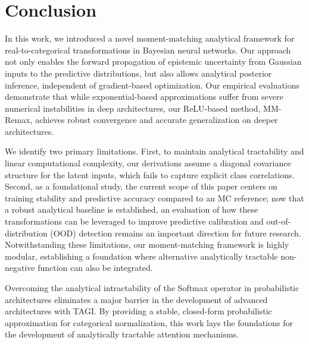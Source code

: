 \documentclass{uai2026} %
\begin{document}
\section{Conclusion}
In this work, we introduced a novel moment-matching analytical framework for real-to-categorical transformations in Bayesian neural networks. Our approach not only enables the forward propagation of epistemic uncertainty from Gaussian inputs to the predictive distributions, but also allows analytical posterior inference, independent of gradient-based optimization. Our empirical evaluations demonstrate that while exponential-based approximations suffer from severe numerical instabilities in deep architectures, our ReLU-based method, MM-Remax, achieves robust convergence and accurate generalization on deeper architectures.

We identify two primary limitations. First, to maintain analytical tractability and linear computational complexity, our derivations assume a diagonal covariance structure for the latent inputs, which fails to capture explicit class correlations. Second, as a foundational study, the current scope of this paper centers on training stability and predictive accuracy compared to an MC reference; now that a robust analytical baseline is established, an evaluation of how these transformations can be leveraged to improve predictive calibration and out-of-distribution (OOD) detection remains an important direction for future research. Notwithstanding these limitations, our moment-matching framework is highly modular, establishing a foundation where alternative analytically tractable non-negative function can also be integrated.

Overcoming the analytical intractability of the Softmax operator in probabilistic architectures eliminates a major barrier in the development of advanced architectures with TAGI. By providing a stable, closed-form probabilistic approximation for categorical normalization, this work lays the foundations for the development of analytically tractable attention mechanisms.


\end{document}
